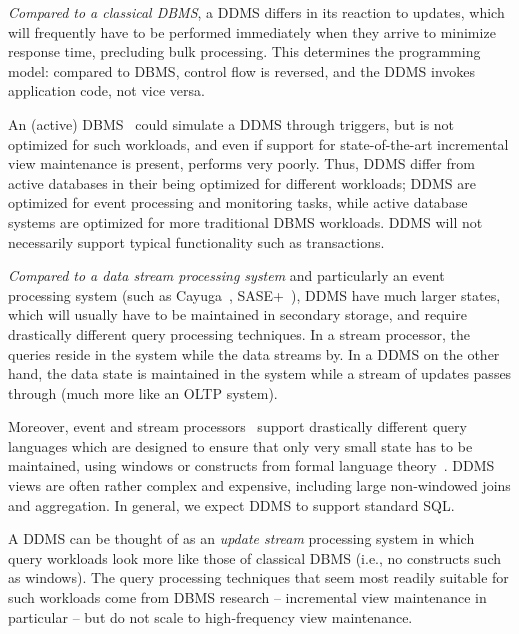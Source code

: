 {{\em Compared to a classical DBMS}\/, a DDMS differs in its reaction to updates,
which will frequently have to be performed immediately when they arrive to
minimize response time, precluding bulk processing. This determines the
programming model: compared to DBMS, control flow is reversed, and the DDMS
invokes application code, not vice versa. 


An (active) DBMS~\cite{ceri-vldb:00} could simulate a DDMS through triggers, but
is not optimized for such workloads, and even if support for state-of-the-art
incremental view maintenance is present, performs very poorly. Thus, DDMS differ
from active databases in their being optimized for different workloads; DDMS are
optimized for event processing and monitoring tasks, while active database
systems are optimized for more traditional DBMS workloads. DDMS will not
necessarily support typical functionality such as transactions.



{\em Compared to a data stream processing system}\/
and particularly an event processing system (such as
Cayuga~\cite{demers-sigmod:07}, SASE+~\cite{agrawal-sigmod:08}),
%
DDMS have much larger states, which will usually have to be maintained in
secondary storage, and require drastically different query processing
techniques. In a stream processor, the queries reside in the system while the
data streams by. In a DDMS on the other hand, the data state is maintained in
the system while a stream of updates passes through (much more like an OLTP
system).

%
Moreover, event and stream processors~\cite{abadi-vldbj:03, motwani-cidr:03,
chandrasekaran-cidr:03} support drastically different query languages which are
designed to ensure that only very small state has to be maintained, using
windows or constructs from formal language theory~\cite{white-pods:07}. DDMS
views are often rather complex and expensive, including large non-windowed joins
and aggregation. In general, we expect DDMS to support standard SQL.


A DDMS can be thought of as an {\em update stream}\/ processing system in which
query workloads look more like those of classical DBMS (i.e., no constructs such
as windows). The query processing techniques that seem most readily suitable for
such workloads come from DBMS research -- incremental view maintenance in
particular -- but do not scale to high-frequency view maintenance.
}

